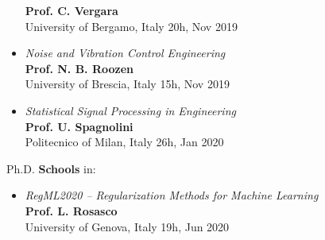 \documentclass[10pt]{article}
\begin{document}
\begin{itemize}
	\textbf{Prof. C. Vergara}\\
	University of Bergamo, Italy \hfill 20h, Nov 2019\\
	\item \textit{Noise and Vibration Control Engineering}\\
	\textbf{Prof. N. B. Roozen}\\
	University of Brescia, Italy \hfill 15h, Nov 2019\\
	\item \textit{Statistical Signal Processing in Engineering}\\
	\textbf{Prof. U. Spagnolini}\\
	Politecnico of Milan, Italy \hfill 26h, Jan 2020\\
\end{itemize}

\vspace{6pt} %

Ph.D. \textbf{Schools} in:
\begin{itemize}
	\setlength\itemsep{-3pt}
	\renewcommand\labelitemi{$\vcenter{\hbox{\tiny$\bullet$}}$}
	\item \textit{RegML2020 -- Regularization Methods for Machine Learning}\\
	\textbf{Prof. L. Rosasco}\\
	University of Genova, Italy \hfill 19h, Jun 2020\\
\end{itemize}

\vspace{6pt} %
\end{document}
